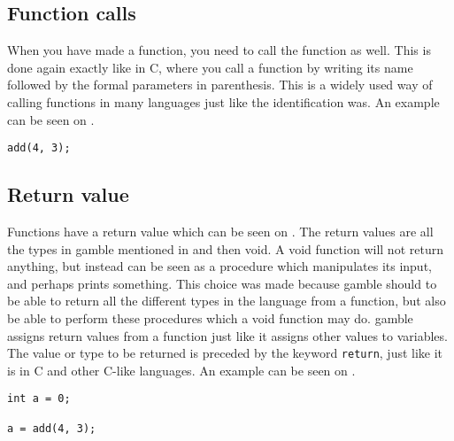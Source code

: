 \subsection*{Function calls}
When you have made a function, you need to call the function as well.
This is done again exactly like in C, where you call a function by writing its name followed by the formal parameters in parenthesis.
This is a widely used way of calling functions in many languages just like the identification was.
An example can be seen on .

\begin{lstlisting}[caption={Function Call},label={lst:functionCall}]
add(4, 3);
\end{lstlisting}


\subsection*{Return value}
Functions have a return value which can be seen on .
The return values are all the types in \gls{gamble} mentioned in  and then void. 
A void function will not return anything, but instead can be seen as a procedure which manipulates its input, and perhaps prints something.
This choice was made because \gls{gamble} should to be able to return all the different types in the language from a function, but also be able to perform these procedures which a void function may do.
\gls{gamble} assigns return values from a function just like it assigns other values to variables.
The value or type to be returned is preceded by the keyword \texttt{return}, just like it is in C and other C-like languages.
An example can be seen on .

\begin{lstlisting}[caption={Return Function},label={lst:returnFunction}]
int a = 0;

a = add(4, 3);
\end{lstlisting}


%


